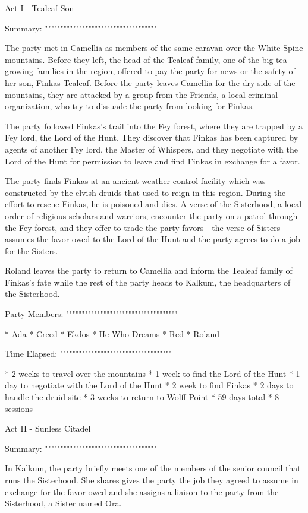 Act I - Tealeaf Son
^^^^^^^^^^^^^^^^^^^^^^^^^^^^^^^^^^^^

Summary:
""""""""""""""""""""""""""""""""""""

The party met in Camellia as members of the same caravan over the White Spine mountains.
Before they left, the head of the Tealeaf family, one of the big tea growing families in the region, offered to pay the party for news or the safety of her son, Finkas Tealeaf.
Before the party leaves Camellia for the dry side of the mountains, they are attacked by a group from the Friends, a local criminal organization, who try to dissuade the party from looking for Finkas.

The party followed Finkas's trail into the Fey forest, where they are trapped by a Fey lord, the Lord of the Hunt.
They discover that Finkas has been captured by agents of another Fey lord, the Master of Whispers, and they negotiate with the Lord of the Hunt for permission to leave and find Finkas in exchange for a favor.

The party finds Finkas at an ancient weather control facility which was constructed by the elvish druids that used to reign in this region.
During the effort to rescue Finkas, he is poisoned and dies.
A verse of the Sisterhood, a local order of religious scholars and warriors, encounter the party on a patrol through the Fey forest, and they offer to trade the party favors - the verse of Sisters assumes the favor owed to the Lord of the Hunt and the party agrees to do a job for the Sisters.

Roland leaves the party to return to Camellia and inform the Tealeaf family of Finkas's fate while the rest of the party heads to Kalkum, the headquarters of the Sisterhood.

Party Members:
""""""""""""""""""""""""""""""""""""

  * Ada
  * Creed
  * Ekdos
  * He Who Dreams
  * Red
  * Roland

Time Elapsed:
""""""""""""""""""""""""""""""""""""

  * 2 weeks to travel over the mountains
  * 1 week to find the Lord of the Hunt
  * 1 day to negotiate with the Lord of the Hunt
  * 2 week to find Finkas
  * 2 days to handle the druid site
  * 3 weeks to return to Wolff Point
  * 59 days total
  * 8 sessions

Act II - Sunless Citadel
^^^^^^^^^^^^^^^^^^^^^^^^^^^^^^^^^^^^

Summary:
""""""""""""""""""""""""""""""""""""

In Kalkum, the party briefly meets one of the members of the senior council that runs the Sisterhood.
She shares gives the party the job they agreed to assume in exchange for the favor owed and she assigns a liaison to the party from the Sisterhood, a Sister named Ora.

